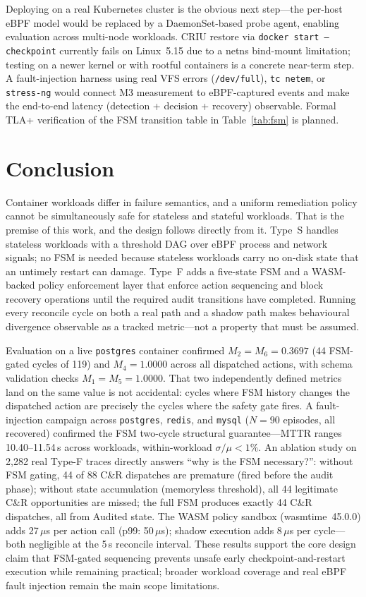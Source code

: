 \documentclass[conference]{IEEEtran}
\begin{document}
Deploying on a real Kubernetes cluster is the obvious next step---the per-host eBPF model would be replaced by a DaemonSet-based probe agent, enabling evaluation across multi-node workloads. CRIU restore via \texttt{docker start --checkpoint} currently fails on Linux~5.15 due to a netns bind-mount limitation; testing on a newer kernel or with rootful containers is a concrete near-term step. A fault-injection harness using real VFS errors (\texttt{/dev/full}), \texttt{tc netem}, or \texttt{stress-ng} would connect M3 measurement to eBPF-captured events and make the end-to-end latency (detection + decision + recovery) observable. Formal TLA+ verification of the FSM transition table in Table~\ref{tab:fsm} is planned.

\section{Conclusion}
\label{sec:conclusion}

Container workloads differ in failure semantics, and a uniform remediation policy cannot be simultaneously safe for stateless and stateful workloads. That is the premise of this work, and the design follows directly from it. Type~S handles stateless workloads with a threshold DAG over eBPF process and network signals; no FSM is needed because stateless workloads carry no on-disk state that an untimely restart can damage. Type~F adds a five-state FSM and a WASM-backed policy enforcement layer that enforce action sequencing and block recovery operations until the required audit transitions have completed. Running every reconcile cycle on both a real path and a shadow path makes behavioural divergence observable as a tracked metric---not a property that must be assumed.

Evaluation on a live \texttt{postgres} container confirmed $M_2 = M_6 = 0.3697$ (44 FSM-gated cycles of 119) and $M_4 = 1.0000$ across all dispatched actions, with schema validation checks $M_1 = M_5 = 1.0000$. That two independently defined metrics land on the same value is not accidental: cycles where FSM history changes the dispatched action are precisely the cycles where the safety gate fires. A fault-injection campaign across \texttt{postgres}, \texttt{redis}, and \texttt{mysql} ($N = 90$ episodes, all recovered) confirmed the FSM two-cycle structural guarantee---MTTR ranges 10.40--11.54\,s across workloads, within-workload $\sigma/\mu < 1\%$. An ablation study on 2,282 real Type-F traces directly answers ``why is the FSM necessary?'': without FSM gating, 44 of 88 C\&R dispatches are premature (fired before the audit phase); without state accumulation (memoryless threshold), all 44 legitimate C\&R opportunities are missed; the full FSM produces exactly 44 C\&R dispatches, all from Audited state. The WASM policy sandbox (wasmtime~45.0.0) adds 27\,$\mu$s per action call (p99: 50\,$\mu$s); shadow execution adds 8\,$\mu$s per cycle---both negligible at the 5\,s reconcile interval. These results support the core design claim that FSM-gated sequencing prevents unsafe early checkpoint-and-restart execution while remaining practical; broader workload coverage and real eBPF fault injection remain the main scope limitations.
\end{document}
